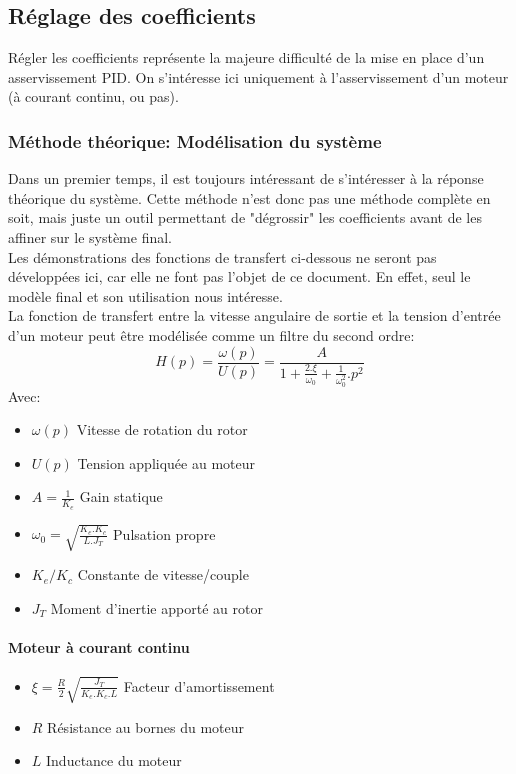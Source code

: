         \newpage

        \subsection{Réglage des coefficients}
            Régler les coefficients représente la majeure difficulté de la mise en place d'un asservissement PID. On s'intéresse ici uniquement à l'asservissement d'un moteur (à courant continu, ou pas).

            \subsubsection{Méthode théorique: Modélisation du système}
            Dans un premier temps, il est toujours intéressant de s'intéresser à la réponse théorique du système. Cette méthode n'est donc pas une méthode complète en soit, mais juste un outil permettant de "dégrossir" les coefficients avant de les affiner sur le système final.\\
            Les démonstrations des fonctions de transfert ci-dessous ne seront pas développées ici, car elle ne font pas l'objet de ce document. En effet, seul le modèle final et son utilisation nous intéresse.\\
            La fonction de transfert entre la vitesse angulaire de sortie et la tension d'entrée d'un moteur peut être modélisée comme un filtre du second ordre:
            \begin{equation}
                H(p) = \frac{\omega(p)}{U(p)} = \frac{A}{1 + \frac{2.\xi}{\omega_0} + \frac{1}{\omega_0^2}.p^2}
            \end{equation}
            Avec:
            \begin{itemize}
                \item $\omega(p)$ Vitesse de rotation du rotor
                \item $U(p)$ Tension appliquée au moteur
                \item $A = \frac{1}{K_e}$ Gain statique
                \item $\omega_0 = \sqrt{\frac{K_e.K_c}{L.J_T}}$ Pulsation propre
                \item $K_e/K_c$ Constante de vitesse/couple
                \item $J_T$ Moment d'inertie apporté au rotor
            \end{itemize}

            \paragraph{Moteur à courant continu}{
                \begin{itemize}
                    \item $\xi = \frac{R}{2}\sqrt{\frac{J_T}{K_e.K_c.L}}$ Facteur d'amortissement
                    \item $R$ Résistance au bornes du moteur
                    \item $L$ Inductance du moteur
                \end{itemize}
            }



